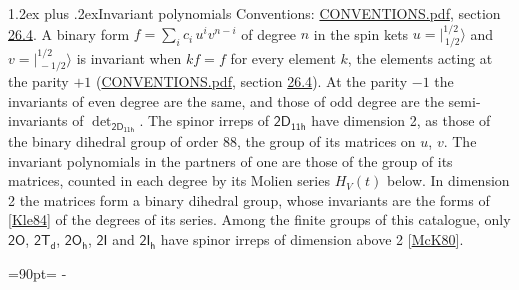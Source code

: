 \documentclass[10pt,a4paper]{article}
\makeatletter
\renewcommand\section{\@startsection{section}{1}{\z@}{-3ex plus -1ex minus -.2ex}%
  {1.2ex plus .2ex}{\normalfont\large\sffamily\bfseries\color{parttitle}}}
\newcommand{\needspace}[1]{\par\penalty-100\begingroup\dimen0=#1\relax\dimen2=\pagegoal
  \advance\dimen2-\pagetotal\ifdim\dimen0>\dimen2\relax\ifdim\dimen2>0pt\vfil\break\fi\fi
  \endgroup}
\numberwithin{equation}{section}
\newcommand{\grp}[1]{\mathsf{#1}}
\newcommand{\jm}[2]{\bigl\lvert{}^{#1}_{\,#2}\bigr\rangle}
\makeatother
\begin{document}
\section{Invariant polynomials}\label{s:invariants}
Conventions: \href{../../CONVENTIONS.pdf}{CONVENTIONS.pdf}, section \href{../../CONVENTIONS.pdf\#conv.26.4}{26.4}.
\leavevmode\label{n:local.binary.form}A binary form $f = \sum_i c_i\, u^i v^{n-i}$ of degree $n$ in the spin kets $u = \jm{1/2}{1/2}$ and $v = \jm{1/2}{-1/2}$ is invariant when $k f = f$ for every element $k$, the elements acting at the parity $+1$ (\href{../../CONVENTIONS.pdf}{CONVENTIONS.pdf}, section \href{../../CONVENTIONS.pdf\#conv.26.4}{26.4}). At the parity $-1$ the invariants of even degree are the same, and those of odd degree are the semi-invariants of $\det_{\grp{2D_{11h}}}$.
The spinor irreps of $\grp{2D_{11h}}$ have dimension 2, as those of the binary dihedral group of order 88, the group of its matrices on $u$, $v$. \label{n:function.hilbert}The invariant polynomials in the partners of one are those of the group of its matrices, counted in each degree by its Molien series $H_V(t)$ below. In dimension 2 the matrices form a binary dihedral group, whose invariants are the forms of [\href{../../../REFERENCES.pdf\#ref.Kle84}{Kle84}] of the degrees of its series. Among the finite groups of this catalogue, only $\grp{2O}$, $\grp{2T_{d}}$, $\grp{2O_{h}}$, $\grp{2I}$ and $\grp{2I_{h}}$ have spinor irreps of dimension above 2 [\href{../../../REFERENCES.pdf\#ref.McK80}{McK80}].
\needspace{90pt}
\end{document}
